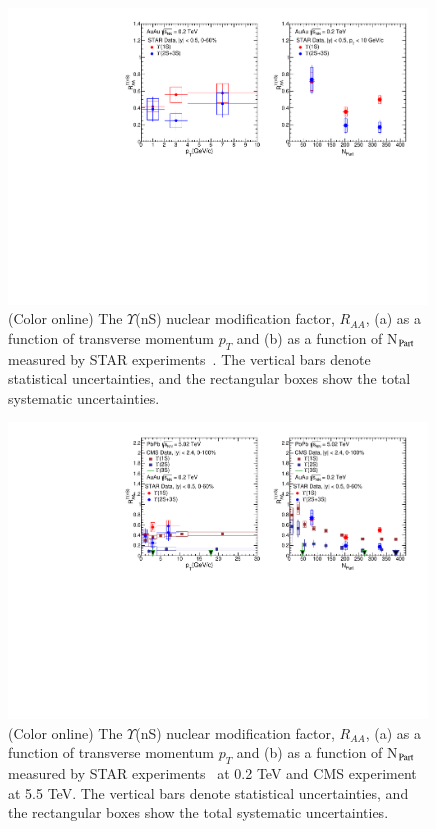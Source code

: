 \begin{figure}
  \includegraphics[width=0.99\textwidth]{Figures/ExpOverview/Fig_RHIC_YnSRAAPt.pdf}
  \caption{(Color online) The $\Upsilon$(nS) nuclear modification factor, $R_{AA}$, (a) as a function of transverse momentum $p_{T}$
    and (b) as a function of N$_{\rm Part}$ measured by STAR experiments~\cite{Wang:2019vau}. The vertical bars denote
    statistical uncertainties, and the rectangular boxes show the total systematic uncertainties.
  }
  \label{fig:RHICYnSRAAPtNPart}
\end{figure}



\begin{figure}
  \includegraphics[width=0.99\textwidth]{Figures/ExpOverview/Fig_RHIC_LHC_YnSRAA.pdf}
  \caption{(Color online) The $\Upsilon$(nS) nuclear modification factor, $R_{AA}$, (a) as a function of transverse momentum $p_{T}$
    and (b) as a function of N$_{\rm Part}$ measured by STAR experiments~\cite{Wang:2019vau} at 0.2 TeV and CMS experiment~\cite{CMS:2018zza} at 5.5 TeV.
    The vertical bars denote statistical uncertainties, and the rectangular boxes show the total systematic uncertainties.
  }
  \label{fig:RHICYnSRAAPtNPart}
\end{figure}



